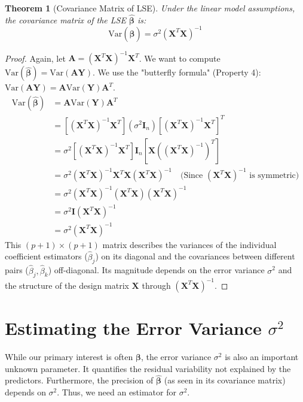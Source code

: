 \documentclass[11pt, letterpaper]{article}
\newtheorem{theorem}{Theorem}[section]
\theoremstyle{definition}
\newcommand{\Var}{\text{Var}}
\newcommand{\mat}[1]{\mathbf{#1}} %
\newcommand{\vect}[1]{\boldsymbol{#1}} %
\newcommand{\T}{^T} %
\begin{document}
\begin{theorem}[Covariance Matrix of LSE]
Under the linear model assumptions, the covariance matrix of the LSE $\hat{\vect{\beta}}$ is:
\[ \Var(\hat{\vect{\beta}}) = \sigma^2 (\mat{X}\T \mat{X})^{-1} \]
\end{theorem}
\begin{proof}
Again, let $\mat{A} = (\mat{X}\T \mat{X})^{-1} \mat{X}\T$. We want to compute $\Var(\hat{\vect{\beta}}) = \Var(\mat{A}\vect{Y})$. We use the "butterfly formula" (Property 4): $\Var(\mat{A}\vect{Y}) = \mat{A} \Var(\vect{Y}) \mat{A}\T$.
\begin{align*}
\Var(\hat{\vect{\beta}}) &= \mat{A} \Var(\vect{Y}) \mat{A}\T \\
&= [(\mat{X}\T \mat{X})^{-1} \mat{X}\T] (\sigma^2 \mat{I}_n) [(\mat{X}\T \mat{X})^{-1} \mat{X}\T]\T \\
&= \sigma^2 [(\mat{X}\T \mat{X})^{-1} \mat{X}\T] \mat{I}_n [\mat{X} ((\mat{X}\T \mat{X})^{-1})\T] \\
&= \sigma^2 (\mat{X}\T \mat{X})^{-1} \mat{X}\T \mat{X} (\mat{X}\T \mat{X})^{-1} \quad \text{(Since } (\mat{X}\T \mat{X})^{-1} \text{ is symmetric)} \\
&= \sigma^2 (\mat{X}\T \mat{X})^{-1} (\mat{X}\T \mat{X}) (\mat{X}\T \mat{X})^{-1} \\
&= \sigma^2 \mat{I} (\mat{X}\T \mat{X})^{-1} \\
&= \sigma^2 (\mat{X}\T \mat{X})^{-1}
\end{align*}
This $(p+1) \times (p+1)$ matrix describes the variances of the individual coefficient estimators ($\hat{\beta}_j$) on its diagonal and the covariances between different pairs ($\hat{\beta}_j, \hat{\beta}_k$) off-diagonal. Its magnitude depends on the error variance $\sigma^2$ and the structure of the design matrix $\mat{X}$ through $(\mat{X}\T \mat{X})^{-1}$.
\end{proof}

\section{Estimating the Error Variance \texorpdfstring{$\sigma^2$}{sigma squared}}

While our primary interest is often $\vect{\beta}$, the error variance $\sigma^2$ is also an important unknown parameter. It quantifies the residual variability not explained by the predictors. Furthermore, the precision of $\hat{\vect{\beta}}$ (as seen in its covariance matrix) depends on $\sigma^2$. Thus, we need an estimator for $\sigma^2$.
\end{document}

